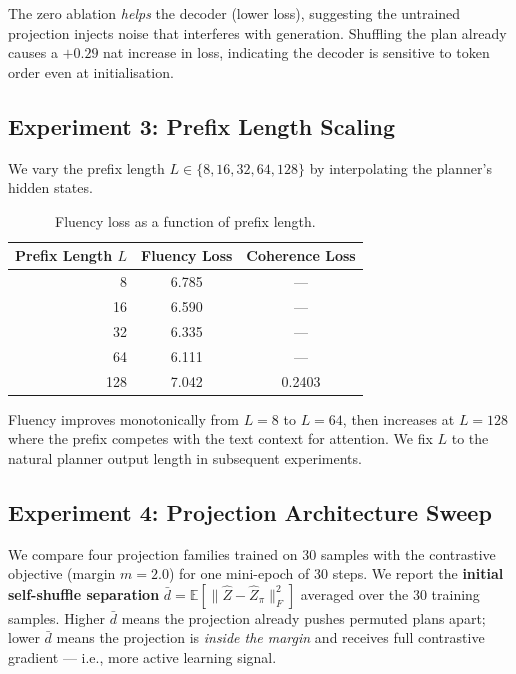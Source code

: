 \documentclass[11pt]{article}
\begin{document}
The zero ablation \emph{helps} the decoder (lower loss), suggesting the
untrained projection injects noise that interferes with generation.
Shuffling the plan already causes a $+0.29$ nat increase in loss, indicating
the decoder is sensitive to token order even at initialisation.

\subsection{Experiment 3: Prefix Length Scaling}
\label{sec:exp3}

We vary the prefix length $L \in \{8, 16, 32, 64, 128\}$ by interpolating the
planner's hidden states.

\begin{table}[h]
\centering
\caption{Fluency loss as a function of prefix length.}
\label{tab:exp3}
\begin{tabular}{rcc}
\toprule
\textbf{Prefix Length} $L$ & \textbf{Fluency Loss} & \textbf{Coherence Loss} \\
\midrule
8 & 6.785 & — \\
16 & 6.590 & — \\
32 & 6.335 & — \\
64 & 6.111 & — \\
128 & 7.042 & 0.2403 \\
\bottomrule
\end{tabular}
\end{table}

Fluency improves monotonically from $L=8$ to $L=64$, then increases at $L=128$
where the prefix competes with the text context for attention.
We fix $L$ to the natural planner output length in subsequent experiments.

\subsection{Experiment 4: Projection Architecture Sweep}
\label{sec:exp4}

We compare four projection families trained on 30 samples with the contrastive
objective (margin $m=2.0$) for one mini-epoch of 30 steps.
We report the \textbf{initial self-shuffle separation}
$\bar{d} = \mathbb{E}[\|\hat{Z} - \hat{Z}_\pi\|_F^2]$
averaged over the 30 training samples.
Higher $\bar{d}$ means the projection already pushes permuted plans apart;
lower $\bar{d}$ means the projection is \emph{inside the margin} and receives
full contrastive gradient — i.e., more active learning signal.
\end{document}
